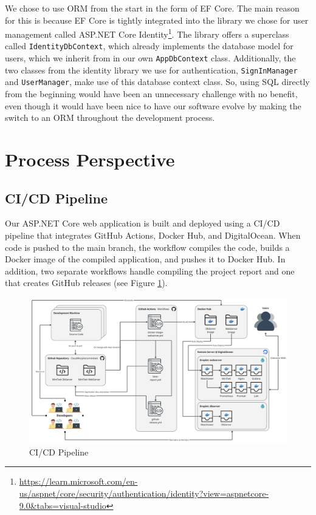 \documentclass[12pt,a4paper,reqno]{report}
\begin{document}
We chose to use ORM from the start in the form of EF Core. The main reason for this is because EF Core is tightly integrated into the library we chose for user management called ASP.NET Core Identity\footnote{\url{https://learn.microsoft.com/en-us/aspnet/core/security/authentication/identity?view=aspnetcore-9.0&tabs=visual-studio}}. The library offers a superclass called \texttt{IdentityDbContext}, which already implements the database model for users, which we inherit from in our own \texttt{AppDbContext} class. Additionally, the two classes from the identity library we use for authentication, \texttt{SignInManager} and \texttt{UserManager}, make use of this database context class. So, using SQL directly from the beginning would have been an unnecessary challenge with no benefit, even though it would have been nice to have our software evolve by making the switch to an ORM throughout the development process.

\section{Process Perspective}
\subsection{CI/CD Pipeline}

Our ASP.NET Core web application is built and deployed using a CI/CD pipeline that integrates GitHub Actions, Docker Hub, and DigitalOcean. When code is pushed to the main branch, the workflow compiles the code, builds a Docker image of the compiled application, and pushes it to Docker Hub. In addition, two separate workflows handle compiling the project report and one that creates GitHub releases (see Figure \ref{fig:CICD-diagram}).

\begin{figure}[H]
    \centering
    \includegraphics[width=1.0\textwidth]{images/CI_CD.png}
    \caption{CI/CD Pipeline}
    \label{fig:CICD-diagram}
\end{figure}
\end{document}
